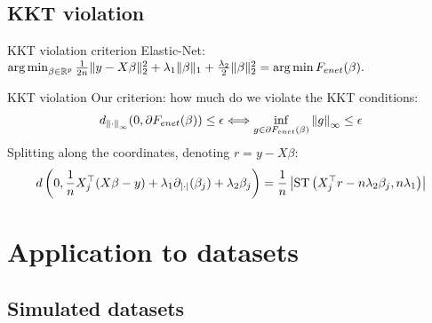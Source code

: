 \documentclass[10pt,aspectratio=43]{beamer}
\begin{document}
\subsection{KKT violation}
\begin{frame}{KKT violation criterion}
Elastic-Net: $\mathop{\mathrm{arg\,min}}_{\beta\in\mathbb{R}^p}
        \frac{1}{2n} \|y - X\beta\|^2_2 + \lambda_1 \|\beta\|_1 +
        \frac{\lambda_2}{2}\|\beta\|^2_2 = \mathop{\mathrm{arg\,min}} F_{enet}(\beta).$

\begin{block}{KKT violation}
Our criterion: how much do we violate the KKT conditions:
\begin{align*}
    d_{\left \lVert \cdot \right \rVert_\infty}(0, \partial F_{enet}(\beta)) \leq \epsilon
    \Longleftrightarrow \inf_{g\in\partial F_{enet}(\beta)}\left \lVert g \right \rVert_\infty
    \leq \epsilon
\end{align*}
Splitting along the coordinates, denoting $r=y-X\beta$:
\begin{align*}
d\left(0, \frac{1}{n}X_j^\top(X\beta - y)
+ \lambda_1 \partial_{\left \vert \cdot \right \vert}(\beta_j)
+ \lambda_2 \beta_j  \right) =
\frac{1}{n} \left| \mathrm{ST}\left( X_j^\top r - n \lambda_2 \beta_j
, n\lambda_1 \right) \right|
\end{align*}
\end{block}
\end{frame}

\section{Application to datasets}
\label{sec:application_to_datasets}

\subsection{Simulated datasets}
\label{subsec:simulated_datasets}
\end{document}
